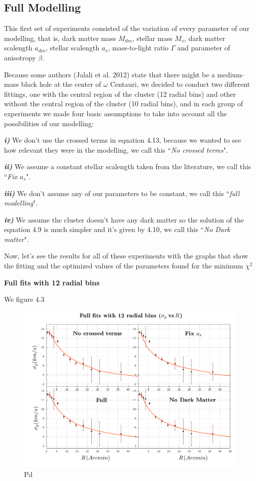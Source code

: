 \subsection{Full Modelling}

This first set of experiments consisted of the variation of every parameter of our modelling, that is, dark matter mass $M_{dm}$, stellar mass $M_{s}$, dark matter scalength $a_{dm}$, stellar scalength $a_{s}$, mass-to-light ratio $\Gamma$ and parameter of anisotropy $\beta$.

Because some authors (Jalali et al. 2012) state that there might be a medium-mass black hole at the center of $\omega$ Centauri, we decided to conduct two different fittings, one with the central region of the cluster (12 radial bins) and other without the central region of the cluster (10 radial bins), and in each group of experiments we made four basic assumptions to take into account all the possibilities of our modelling:

\textbf{\textit{i)}} We don't use the crossed terms in equation 4.13, because we wanted to see how relevant they were in the modelling, we call this ``\textit{No crossed terms}". 

\textbf{\textit{ii)}} We assume a constant stellar scalength taken from the literature, we call this ``\textit{Fix $a_{s}$}".

\textbf{\textit{iii)}} We don't assume any of our parameters to be constant, we call this ``\textit{full modelling}". 

\textbf{\textit{iv)}} We assume the cluster doesn't have any dark matter so the solution of the equation 4.9 is much simpler and it's given by 4.10, we call this ``\textit{No Dark matter}".

Now, let's see the results for all of these experiments with the graphs that show the fitting and the optimized values of the parameters found for the minimum $\chi^{2}$

\textbf{Full fits with 12 radial bins}

We figure 4.3

\begin{figure}[H]
\centering
\includegraphics[width=15cm]{images/all_params_refinado_12.png}
\caption[Pg]{Pd}
\end{figure}

